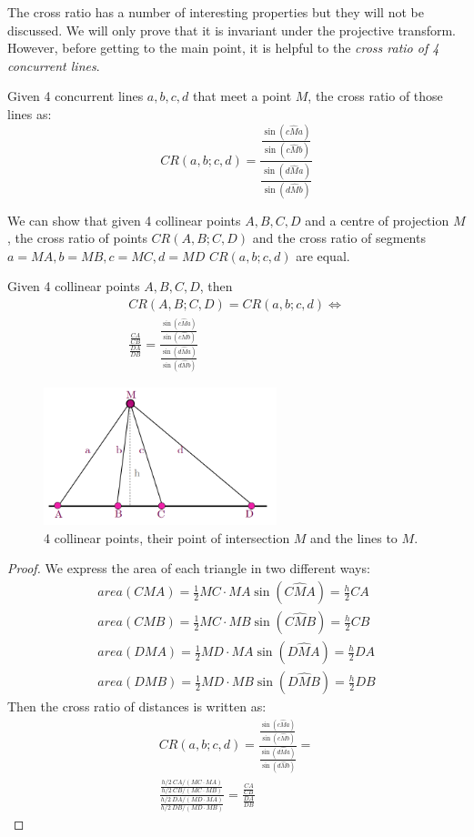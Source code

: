 \documentclass[a4paper]{article}
\begin{document}
The cross ratio has a number of interesting properties but they will not be discussed. We will only prove that it is invariant under the projective transform. However, before getting to the main point, it is helpful to the \textit{cross ratio of 4 concurrent lines}.
\begin{definition}
Given 4 concurrent lines $a,b,c,d$ that meet a point $M$, the cross ratio of those lines as:
\begin{equation}
    CR(a,b;c,d) = \frac{\frac{\sin(c\hat{M}a)}{\sin(c\hat{M}b)}}
    {\frac{\sin(d\hat{M}a)}{\sin(d\hat{M}b)}}
\end{equation}
\end{definition}
We can show that given 4 collinear points $A,B,C,D$ and a centre of projection $M$, the cross ratio of points $CR(A,B;C,D)$ and the cross ratio of segments $a=MA,b=MB,c=MC,d=MD$ $CR(a,b;c,d)$ are equal.
\begin{lemma}
Given 4 collinear points $A,B,C,D$, then
\begin{gather}
    CR(A,B;C,D) = CR(a,b;c,d) \Longleftrightarrow \nonumber \\
    \frac{\frac{CA}{CB}}{\frac{DA}{DB}} = \frac{\frac{\sin(c\hat{M}a)}{\sin(c\hat{M}b)}}  {\frac{\sin(d\hat{M}a)}{\sin(d\hat{M}b)}}
    \label{eq:cr_points_equals_cr_lines}
\end{gather}
\end{lemma}
\begin{figure}[H]
    \centering
    \includegraphics[height=4cm]{img/cross_ratio_points_lines.png}
    \caption{4 collinear points, their point of intersection $M$ and the lines to $M$.}
\end{figure}
\begin{proof}
We express the area of each triangle in two different ways:
\begin{align*}
area(CMA) = \frac{1}{2}MC \cdot MA  \sin(C\hat{M}A) = \frac{h}{2} CA \\
area(CMB) = \frac{1}{2}MC \cdot MB  \sin(C\hat{M}B) = \frac{h}{2} CB \\
area(DMA) = \frac{1}{2}MD \cdot MA  \sin(D\hat{M}A) = \frac{h}{2} DA \\
area(DMB) = \frac{1}{2}MD \cdot MB  \sin(D\hat{M}B) = \frac{h}{2} DB
\end{align*}
Then the cross ratio of distances is written as:
\begin{align*}
CR(a,b;c,d) = \frac{\frac{\sin(c\hat{M}a)}{\sin(c\hat{M}b)}} {\frac{\sin(d\hat{M}a)}{\sin(d\hat{M}b)}} = \\
\frac{\frac{h/2\ CA/(MC\cdot MA)}{h/2\ CB/(MC\cdot MB)}}
{\frac{h/2\ DA/(MD\cdot MA)}{h/2\ DB/(MD\cdot MB)}} = \frac{\frac{CA}{CB}}{\frac{DA}{DB}}
\end{align*}
\end{proof}
\end{document}
